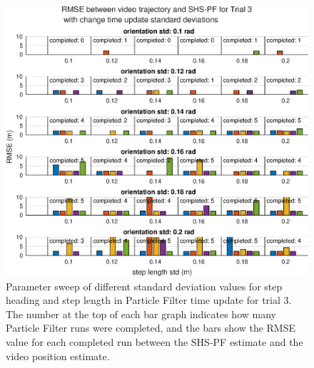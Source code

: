 \begin{figure}[H]
	\centering
	\includegraphics[width=0.85\linewidth]{images/20201201_1326_parameter_search_trial3_1}
	\caption{Parameter sweep of different standard deviation values for step heading and step length in Particle Filter time update for trial 3. The number at the top of each bar graph indicates how many Particle Filter runs were completed, and the bars show the RMSE value for each completed run between the SHS-PF estimate and the video position estimate.  }
	\label{fig:rmse_between_video_trajectory_andshs-pf_for_trial_3_1}
\end{figure}


